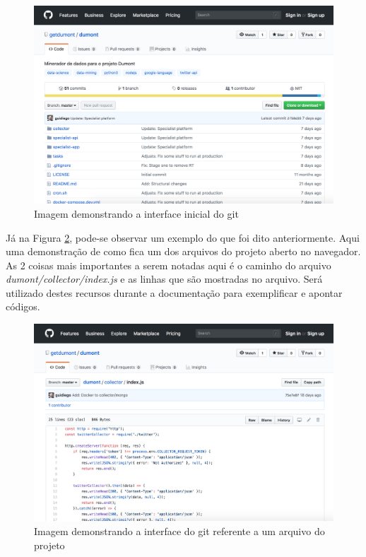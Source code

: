 \begin{figure}
    \centering
    \includegraphics[width=.8\textwidth]{imagens/git_init.png}
    \caption{Imagem demonstrando a interface inicial do git}
    \label{fig:git_init}
\end{figure}

Já na Figura \ref{fig:git_file}, pode-se observar um exemplo do que foi dito anteriormente. Aqui uma demonstração de como fica um dos arquivos do projeto aberto no navegador. As 2 coisas mais importantes a serem notadas aqui é o caminho do arquivo \textit{dumont/collector/index.js} e as linhas que são mostradas no arquivo. Será utilizado destes recursos durante a documentação para exemplificar e apontar códigos.

\begin{figure}
    \centering
    \includegraphics[width=.8\textwidth]{imagens/git_file.png}
    \caption{Imagem demonstrando a interface do git referente a um arquivo do projeto}
    \label{fig:git_file}
\end{figure}
